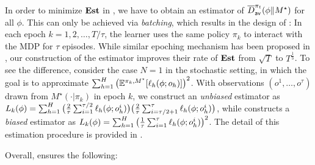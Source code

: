In order to minimize $\textbf{\textup{Est}}$ in , we have to obtain an estimator of $\overline{D}^{\pi_t}_{\mathsf{av}}(\phi\|M^\star)$ for all $\phi$. This can only be achieved via \emph{batching}, which results in the design of : In each epoch $k=1,2,\ldots, T/\tau$, the learner uses the same policy $\pi_k$ to interact with the MDP for $\tau$ episodes. While similar epoching mechanism has been proposed in \cite{foster2024model}, our construction of the estimator improves their rate of $\textbf{\textup{Est}}$ from $\sqrt{T}$ to $T^{\frac{1}{3}}$. To see the difference, consider the case $N=1$ in the stochastic setting, in which the goal is to approximate $\sum_{h=1}^H \left(\mathbb{E}^{\pi_k, M^\star}[\ell_h(\phi; o_h)]\right)^2$. With observations $(o^1, \ldots, o^\tau)$ drawn from $M^\star(\cdot|\pi_k)$ in epoch $k$, we construct an \emph{unbiased} estimator as $L_k(\phi) =\sum_{h=1}^H\big(\frac{2}{\tau}\sum_{i=1}^{\tau/2} \ell_h(\phi; o_{h}^i)\big)\big(\frac{2}{\tau}\sum_{i=\tau/2+1}^{\tau} \ell_h(\phi; o_{h}^i)\big)$, while \cite{foster2024model} constructs a \emph{biased} estimator as $L_k(\phi) =\sum_{h=1}^H\big(\frac{1}{\tau}\sum_{i=1}^{\tau} \ell_h(\phi; o_{h}^i)\big)^2$. The detail of this estimation procedure is provided in . 



\iffalse
Overall,  ensures the following:  





